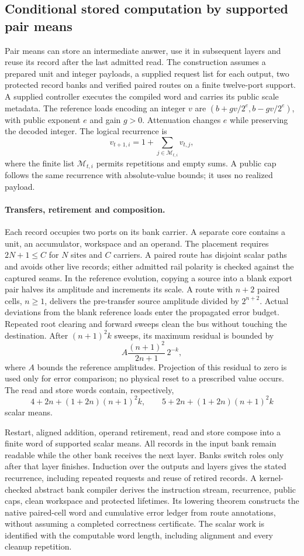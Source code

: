 \subsection{Conditional stored computation by supported pair means}
\label{sec:native-stored-programs}

Pair means can store an intermediate answer, use it in subsequent layers and
reuse its record after the last admitted read. The construction assumes a
prepared unit and integer payloads, a supplied request list for each output,
two protected record banks and verified paired routes on a finite twelve-port
support. A supplied controller executes the compiled word and carries its
public scale metadata.
The reference loads encoding an integer $v$ are
$(b+gv/2^e,b-gv/2^e)$, with public exponent $e$ and gain $g>0$.
Attenuation changes $e$ while preserving the decoded integer. The logical
recurrence is
\[
 v_{t+1,i}=1+\sum_{j\in\mathcal M_{t,i}}v_{t,j},
\]
where the finite list $\mathcal M_{t,i}$ permits repetitions and empty sums.
A public cap follows the same recurrence with absolute-value bounds;
it uses no realized payload.

\paragraph{Transfers, retirement and composition.}
Each record occupies two ports on its bank carrier. A separate core contains
a unit, an accumulator, workspace and an operand. The placement requires
$2N+1\leq C$ for $N$ sites and $C$ carriers. A paired route has disjoint
scalar paths and avoids other live records; either admitted rail polarity is
checked against the captured seams. In the reference evolution, copying a
source into a blank export pair halves its amplitude and increments its
scale. A route with $n+2$ paired cells, $n\geq1$, delivers the pre-transfer
source amplitude divided by $2^{n+2}$. Actual deviations from the blank
reference loads enter the propagated error budget.
Repeated root clearing and forward sweeps clean the bus without touching
the destination. After $(n+1)^2k$ sweeps, its maximum residual is bounded by
\[
 A\frac{(n+1)^2}{2n+1}\,2^{-k},
\]
where $A$ bounds the reference amplitudes. Projection of this residual to
zero is used only for error comparison; no physical reset to a prescribed
value occurs. The read and store words contain, respectively,
\[
 4+2n+(1+2n)(n+1)^2k,
 \qquad 5+2n+(1+2n)(n+1)^2k
\]
scalar means.

Restart, aligned addition, operand retirement, read and store compose into a
finite word of supported scalar means. All records in the input bank remain
readable while the other bank receives the next layer. Banks switch roles
only after that layer finishes. Induction over the outputs and layers gives
the stated recurrence, including repeated requests and reuse of retired
records. A kernel-checked abstract bank compiler derives the instruction
stream, recurrence, public caps, clean workspace and protected lifetimes.
Its lowering theorem constructs the native paired-cell word and cumulative
error ledger from route annotations, without assuming a completed correctness
certificate. The scalar work is identified with the computable word length,
including alignment and every cleanup repetition.

